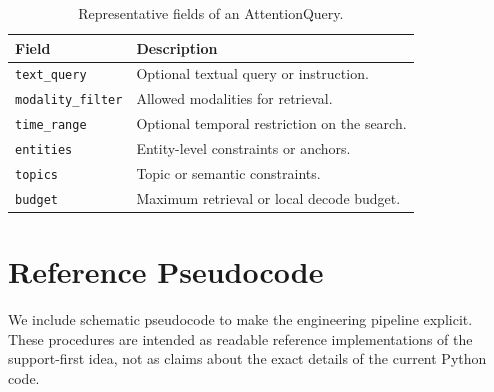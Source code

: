 \documentclass[11pt]{article}
\begin{document}
\begin{table}[h]
\centering
\caption{Representative fields of an AttentionQuery.}
\label{tab:attentionquery-fields}
\begin{tabular}{>{\raggedright\arraybackslash}p{} >{\raggedright\arraybackslash}p{}}
\toprule
Field & Description \\
\midrule
\texttt{text\_query} & Optional textual query or instruction. \\
\texttt{modality\_filter} & Allowed modalities for retrieval. \\
\texttt{time\_range} & Optional temporal restriction on the search. \\
\texttt{entities} & Entity-level constraints or anchors. \\
\texttt{topics} & Topic or semantic constraints. \\
\texttt{budget} & Maximum retrieval or local decode budget. \\
\bottomrule
\end{tabular}
\end{table}

\section{Reference Pseudocode}
We include schematic pseudocode to make the engineering pipeline explicit. These procedures are intended as readable reference implementations of the support-first idea, not as claims about the exact details of the current Python code.
\end{document}
